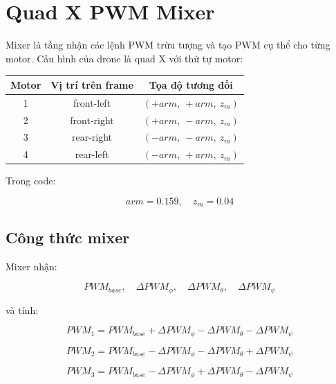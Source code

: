 \section{Quad X PWM Mixer}

Mixer là tầng nhận các lệnh PWM trừu tượng và tạo PWM cụ thể cho từng motor.
Cấu hình của drone là quad X với thứ tự motor:

\begin{center}
\begin{tabular}{|c|c|c|}
\hline
Motor & Vị trí trên frame & Tọa độ tương đối \\
\hline
1 & front-left & $(+arm,\ +arm,\ z_m)$ \\
\hline
2 & front-right & $(+arm,\ -arm,\ z_m)$ \\
\hline
3 & rear-right & $(-arm,\ -arm,\ z_m)$ \\
\hline
4 & rear-left & $(-arm,\ +arm,\ z_m)$ \\
\hline
\end{tabular}
\end{center}

Trong code:

\begin{equation}
    arm = 0.159,\quad z_m = 0.04
\end{equation}

\subsection{Công thức mixer}

Mixer nhận:

\begin{equation}
    PWM_{base},\quad
    \Delta PWM_\phi,\quad
    \Delta PWM_\theta,\quad
    \Delta PWM_\psi
\end{equation}

và tính:

\begin{equation}
    PWM_1
    =
    PWM_{base}
    +
    \Delta PWM_\phi
    -
    \Delta PWM_\theta
    -
    \Delta PWM_\psi
\end{equation}

\begin{equation}
    PWM_2
    =
    PWM_{base}
    -
    \Delta PWM_\phi
    -
    \Delta PWM_\theta
    +
    \Delta PWM_\psi
\end{equation}

\begin{equation}
    PWM_3
    =
    PWM_{base}
    -
    \Delta PWM_\phi
    +
    \Delta PWM_\theta
    -
    \Delta PWM_\psi
\end{equation}

